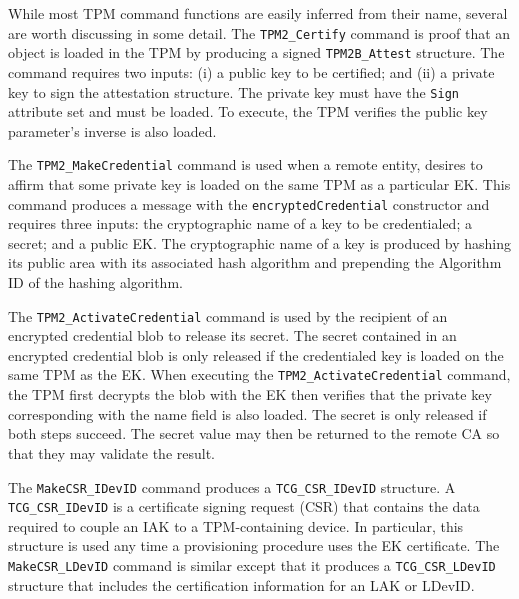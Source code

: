 \documentclass[runningheads]{llncs}
\begin{document}

While most TPM command functions are easily inferred from their name,
several are worth discussing in some detail.  The \verb|TPM2_Certify|
command is proof that an object is loaded in the TPM by producing a
signed \verb|TPM2B_Attest| structure. The command requires two inputs:
(i) a public key to be certified; and (ii) a private key to sign the
attestation structure. The private key must have the \verb|Sign|
attribute set and must be loaded. To execute, the TPM verifies the
public key parameter's inverse is also loaded.


The \verb|TPM2_MakeCredential| command is used when a remote entity,
desires to affirm that some private key is loaded on the same TPM as a
particular EK. This command produces a message with the
\verb|encryptedCredential| constructor and requires three inputs: the
cryptographic name of a key to be credentialed; a secret; and a public
EK. The cryptographic name of a key is produced by hashing its public
area with its associated hash algorithm and prepending the Algorithm
ID of the hashing algorithm.

The \verb|TPM2_ActivateCredential| command is used by the recipient of
an encrypted credential blob to release its secret.  The secret
contained in an encrypted credential blob is only released if the
credentialed key is loaded on the same TPM as the EK.  When executing
the \verb|TPM2_ActivateCredential| command, the TPM first decrypts the
blob with the EK then verifies that the private key corresponding with
the name field is also loaded. The secret is only released if both
steps succeed. The secret value may then be returned to the remote CA
so that they may validate the result.

The \verb|MakeCSR_IDevID| command produces a \verb|TCG_CSR_IDevID|
structure.  A \verb|TCG_CSR_IDevID| is a certificate signing request
(CSR) that contains the data required to couple an IAK to a
TPM-containing device.  In particular, this structure is used any time
a provisioning procedure uses the EK certificate.  The
\verb|MakeCSR_LDevID| command is similar except that it produces a
\verb|TCG_CSR_LDevID| structure that includes the certification
information for an LAK or LDevID.
\end{document}
